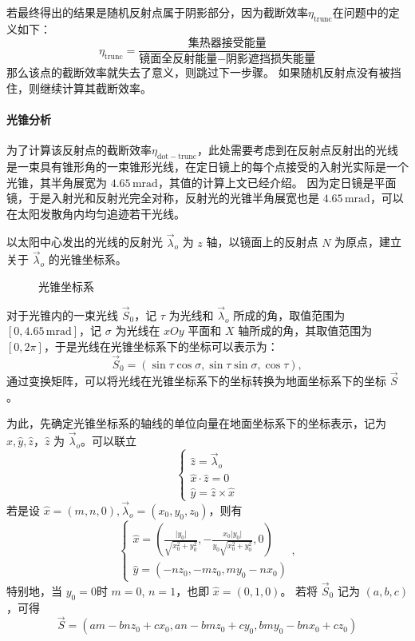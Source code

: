 \documentclass[../main.tex]{subfiles}
\begin{document}
若最终得出的结果是随机反射点属于阴影部分，因为截断效率\(\eta _{\mathrm{trunc}}\)在问题中的定义如下：
\begin{equation}
\eta _{\mathrm{trunc}} = \frac{\text{集热器接受能量}}{\text{镜面全反射能量} - \text{阴影遮挡损失能量}}
\end{equation}
那么该点的截断效率就失去了意义，则跳过下一步骤。
如果随机反射点没有被挡住，则继续计算其截断效率。

\paragraph{光锥分析}
为了计算该反射点的截断效率\(\eta _{\mathrm{dot}{-}\mathrm{trunc}}\)，此处需要考虑到在反射点反射出的光线是一束具有锥形角的一束锥形光线，在定日镜上的每个点接受的入射光实际是一个光锥，其半角展宽为 \(4.65 \, \mathrm{m}\mathrm{rad}\)，其值的计算上文已经介绍。
因为定日镜是平面镜，于是入射光和反射光完全对称，反射光的光锥半角展宽也是 \(4.65\, \mathrm{mrad}\)，可以在太阳发散角内均匀追迹若干光线。

以太阳中心发出的光线的反射光 \(\vec\lambda _{o} \) 为 \(z\) 轴，以镜面上的反射点 \(N\) 为原点，建立关于 \(\vec \lambda _{o}\) 的光锥坐标系。
%
\begin{figure}[H]
\centering

\caption{\kaishu 光锥坐标系}
\end{figure}
%

对于光锥内的一束光线 \(\vec S _{0}\)，记 \(\tau\) 为光线和 \(\vec\lambda _{o}\) 所成的角，取值范围为 \([0, 4.65\, \mathrm{m}\mathrm{rad}]\)，记 \(\sigma\) 为光线在 \(xOy\) 平面和 \(X\) 轴所成的角，其取值范围为 \([0 , 2\pi]\)，于是光线在光锥坐标系下的坐标可以表示为：
\[
\vec S _{0} = ( \sin \tau \cos \sigma, \sin \tau \sin \sigma, \cos \tau),
\]
通过变换矩阵，可以将光线在光锥坐标系下的坐标转换为地面坐标系下的坐标 \(\vec S\)。

为此，先确定光锥坐标系的轴线的单位向量在地面坐标系下的坐标表示，记为 \(\hat x, \hat y, \hat z\)，\(\hat z\) 为 \(\vec \lambda _{o}\)。可以联立
\[
\begin{cases}
\hat z = \vec \lambda _{o}\\
\hat x \cdot \hat z = 0\\
\hat y = \hat z \times \hat x
\end{cases}
\]
若是设 \(\hat x = (m , n , 0), \vec \lambda _{o} = (x_0, y_0,z_0)\)，则有
\[
\begin{cases}
\displaystyle\hat x = \left(\frac{\vert y_{0} \vert}{\sqrt{x_{0}^{2}+ y _{0} ^{2}}}, {-}\frac{x_{0}\vert y_{0} \vert}{y_{0}\sqrt{x_{0}^{2}+y_{0}^{2}}}, 0\right)\\
\displaystyle \hat y = ({-} n z_{0}, - m z_{0} , my_{0} - n x_{0})
\end{cases},
\]
特别地，当 \(y_{0} = 0\)时 \(m = 0 \), \(n=1\)，也即 \(\hat x  = (0,1,0)\)。
若将 \(\vec S_{0}\) 记为 \((a,b ,c)\)，可得
\begin{equation}
\vec S = (am - b nz _{0}+ c x_{0}, an - bmz_{0} + cy_{0}, bmy_{0} - bnx _{0} + cz_{0})
\end{equation}
\end{document}
